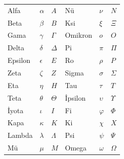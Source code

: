 


\begin{center}
    \begin{tabular}{lll@{\qquad}lll}
    Alfa & $\alpha$ & $A$ &
    Nü & $\nu$ & $N$ \\
    Beta & $\beta$ & $B$ &
    Ksi & $\xi$ & $\Xi$ \\
    Gama & $\gamma$ & $\Gamma$ &
    Omikron & $o$ & $O$ \\
    Delta & $\delta$ & $\Delta$ &
    Pi & $\pi$ & $\Pi$ \\
    Epsilon & $\epsilon$ & $E$ &
    Ro & $\rho$ & $P$ \\
    Zeta & $\zeta$ & $Z$ &
    Sigma & $\sigma$ & $\Sigma$ \\
    Eta & $\eta$ & $H$ &
    Tau & $\tau$ & $T$ \\
    Teta & $\theta$ & $\Theta$ &
    İpsilon & $\upsilon$ & $\Upsilon$ \\
    İyota & $\iota$ & $I$ &
    Fi & $\varphi$ & $\Phi$ \\
    Kapa & $\kappa$ & $K$ &
    Ki & $\chi$ & $X$ \\
    Lambda & $\lambda$ & $\Lambda$ &
    Psi & $\psi$ & $\Psi$ \\
    Mü & $\mu$ & $M$ &
    Omega & $\omega$ & $\Omega$
    \end{tabular}
\end{center}

